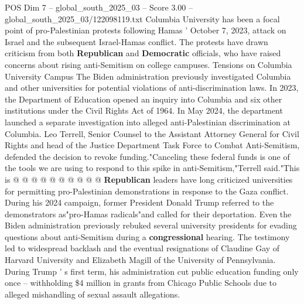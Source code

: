 \begin{textsample}{POS Dim 7 – global\_south\_2025\_03 – Score 3.00 – global\_south\_2025\_03/122098119.txt}
Columbia University has been a focal point of pro-Palestinian protests following Hamas ' October 7, 2023, attack on Israel and the subsequent Israel-Hamas conflict.
The protests have drawn criticism from both \textbf{Republican} and \textbf{Democratic} officials, who have raised concerns about rising anti-Semitism on college campuses.
Tensions on Columbia University Campus The Biden administration previously investigated Columbia and other universities for potential violations of anti-discrimination laws.
In 2023, the Department of Education opened an inquiry into Columbia and six other institutions under the Civil Rights Act of 1964.
In May 2024, the department launched a separate investigation into alleged anti-Palestinian discrimination at Columbia.
Leo Terrell, Senior Counsel to the Assistant Attorney General for Civil Rights and head of the Justice Department Task Force to Combat Anti-Semitism, defended the decision to revoke funding."Canceling these federal funds is one of the tools we are using to respond to this spike in anti-Semitism,"Terrell said."This is @ @ @ @ @ @ @ @ @ @ \textbf{Republican} leaders have long criticized universities for permitting pro-Palestinian demonstrations in response to the Gaza conflict.
During his 2024 campaign, former President Donald Trump referred to the demonstrators as"pro-Hamas radicals"and called for their deportation.
Even the Biden administration previously rebuked several university presidents for evading questions about anti-Semitism during a \textbf{congressional} hearing.
The testimony led to widespread backlash and the eventual resignations of Claudine Gay of Harvard University and Elizabeth Magill of the University of Pennsylvania.
During Trump ' s first term, his administration cut public education funding only once -- withholding \$4 million in grants from Chicago Public Schools due to alleged mishandling of sexual assault allegations.

\end{textsample}
